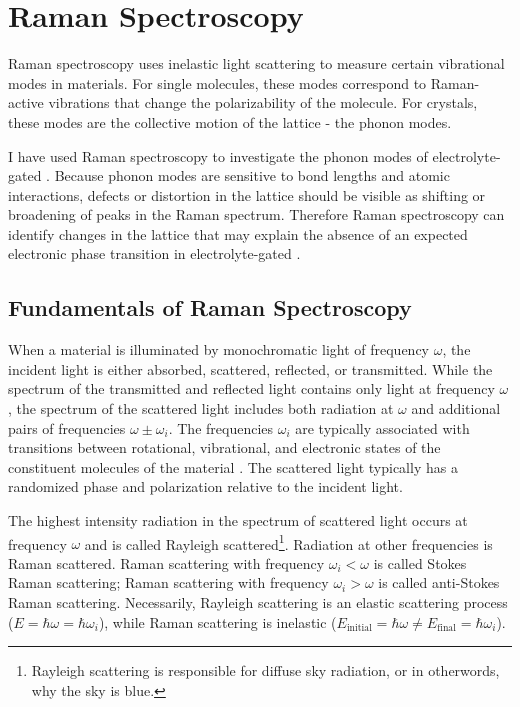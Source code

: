 \chapter{Raman Spectroscopy}

Raman spectroscopy uses inelastic light scattering to measure certain vibrational modes in materials. For single molecules, these modes correspond to Raman-active vibrations that change the polarizability of the molecule. For crystals, these modes are the collective motion of the lattice - the phonon modes.

I have used Raman spectroscopy to investigate the phonon modes of electrolyte-gated \ruclnospace. Because phonon modes are sensitive to bond lengths and atomic interactions, defects or distortion in the lattice should be visible as shifting or broadening of peaks in the Raman spectrum. Therefore Raman spectroscopy can identify changes in the lattice that may explain the absence of an expected electronic phase transition in electrolyte-gated \ruclnospace.

\section{Fundamentals of Raman Spectroscopy}
When a material is illuminated by monochromatic light of frequency $\omega$, the incident light is either absorbed, scattered, reflected, or transmitted. While the spectrum of the transmitted and reflected light contains only light at frequency $\omega$, the spectrum of the scattered light includes both radiation at $\omega$ and additional pairs of frequencies $\omega \pm \omega_{i}$. The frequencies $\omega_{i}$ are typically associated with transitions between rotational, vibrational, and electronic states of the constituent molecules of the material \cite{Long2002}. The scattered light typically has a randomized phase and polarization relative to the incident light.

The highest intensity radiation in the spectrum of scattered light occurs at frequency $\omega$ and is called Rayleigh scattered\footnote{Rayleigh scattering is responsible for diffuse sky radiation, or in otherwords, why the sky is blue.}. Radiation at other frequencies is Raman scattered. Raman scattering with frequency $\omega_{i} < \omega$ is called Stokes Raman scattering; Raman scattering with frequency $\omega_{i} > \omega$ is called anti-Stokes Raman scattering. Necessarily, Rayleigh scattering is an elastic scattering process ($E = \hbar \omega = \hbar \omega_{i}$), while Raman scattering is inelastic ($E_{\text{initial}} = \hbar \omega \neq E_{\text{final}} = \hbar \omega_{i}$).

